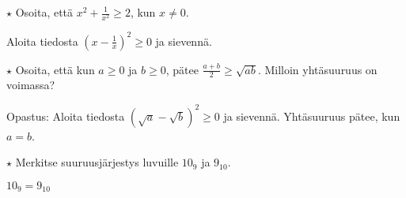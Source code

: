 \begin{tehtavasivu}
\begin{tehtava}
$\star$ Osoita, että $x^2+\frac{1}{x^2}\geq 2$, kun $x \neq 0$.
    \begin{vastaus}
     Aloita tiedosta $\left(x-\frac{1}{x}\right)^2 \geq 0$ ja sievennä.
    \end{vastaus}
\end{tehtava}

\begin{tehtava} 
$\star$ Osoita, että kun $a \geq 0$ ja $b \geq 0$, pätee $\frac{a+b}{2} \geq \sqrt{ab}$. Milloin yhtäsuuruus on voimassa?
    \begin{vastaus}
     Opastus: Aloita tiedosta $\left(\sqrt{a}-\sqrt{b}\right)^2 \geq 0$ ja sievennä. Yhtäsuuruus pätee, kun $a = b$.
    \end{vastaus}
\end{tehtava}

\begin{tehtava}
$\star$ Merkitse suuruusjärjestys luvuille $10_9$ ja $9_{10}$.
	\begin{vastaus}
	$10_9=9_{10}$
	\end{vastaus}
\end{tehtava}

\end{tehtavasivu}